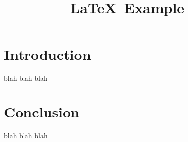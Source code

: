 \documentclass{article}
\title{\LaTeX\ Example}
\begin{document}
\maketitle

\section{Introduction}

blah blah blah

\section{Conclusion}

blah blah blah
\end{document}
